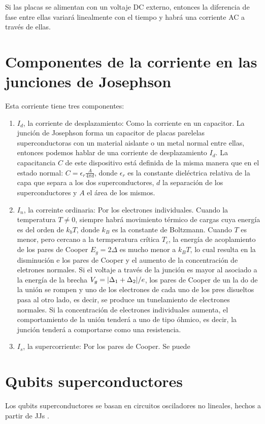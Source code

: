 Si las placas se alimentan con un voltaje DC externo, entonces la diferencia de fase entre ellas variará linealmente con el tiempo y habrá una corriente AC a través de ellas.

\section{Componentes de la corriente en las junciones de Josephson}

Esta corriente tiene tres componentes:

\begin{enumerate}
    \item $I_d$, la corriente de desplazamiento: Como la corriente en un capacitor. La junción de Josephson forma un capacitor de placas parelelas superconductoras con un material aislante o un metal normal entre ellas, entonces podemos hablar de una corriente de desplazamiento $I_d$. La capacitancia $C$ de este dispositivo está definida de la misma manera que en el estado normal: $C = \epsilon_r \frac{A}{4 \pi d}$, donde $\epsilon_r$ es la constante dieléctrica relativa de la capa que separa a los dos superconductores, $d$ la separación de los superconductores y $A$ el área de los mismos.
    \item $I_n$, la correinte ordinaria: Por los electrones individuales. Cuando la temperatura $T \neq 0$, siempre habrá movimiento térmico de cargas cuya energía es del orden de $k_b T$, donde $k_B$ es la constante de Boltzmann. Cuando $T$ es menor, pero cercano a la termperatura crítica $T_c$, la energía de acoplamiento de los pares de Cooper $E_g = 2 \Delta$ es mucho menor a $k_B T$, lo cual resulta en la disminución e los pares de Cooper y el aumento de la concentración de eletrones normales. Si el voltaje a través de la junción es mayor al asociado a la energía de la brecha $V_g = \abs{\Delta_1 + \Delta_2}/e$, los pares de Cooper de un la do de la unión se rompen y uno de los electrones de cada uno de los pres disueltos pasa al otro lado, es decir, se produce un tunelamiento de electrones normales. Si la concentración de electrones individuales aumenta, el comportamiento de la unión tenderá a uno de tipo óhmico, es decir, la junción tenderá a comportarse como una resistencia.
    \item $I_s$, la supercorriente: Por los pares de Cooper. Se puede 
\end{enumerate}

\section{Qubits superconductores}
Los qubits superconductores se basan en circuitos osciladores no lineales, hechos a partir de JJs \cite{wendin}.
\vspace{0.5cm}

